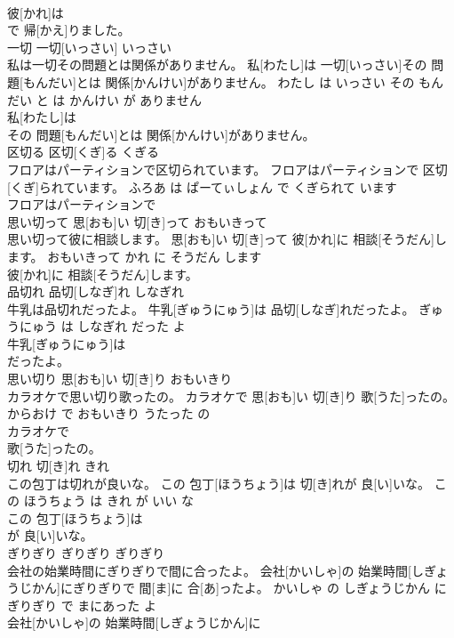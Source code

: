 \documentclass[8pt]{extreport}
\begin{document}
\begin{CJK}{UTF8}{min}
\\	彼[かれ]は
\\	で 帰[かえ]りました。			
\\	一切	一切[いっさい]	いっさい	
\\	私は一切その問題とは関係がありません。	私[わたし]は 一切[いっさい]その 問題[もんだい]とは 関係[かんけい]がありません。	わたし は いっさい その もんだい と は かんけい が ありません	
\\	私[わたし]は
\\	その 問題[もんだい]とは 関係[かんけい]がありません。			
\\	区切る	区切[くぎ]る	くぎる	
\\	フロアはパーティションで区切られています。	フロアはパーティションで 区切[くぎ]られています。	ふろあ は ぱーてぃしょん で くぎられて います	
\\	フロアはパーティションで
\\	思い切って	思[おも]い 切[き]って	おもいきって	
\\	思い切って彼に相談します。	思[おも]い 切[き]って 彼[かれ]に 相談[そうだん]します。	おもいきって かれ に そうだん します	
\\	彼[かれ]に 相談[そうだん]します。			
\\	品切れ	品切[しなぎ]れ	しなぎれ	
\\	牛乳は品切れだったよ。	牛乳[ぎゅうにゅう]は 品切[しなぎ]れだったよ。	ぎゅうにゅう は しなぎれ だった よ	
\\	牛乳[ぎゅうにゅう]は
\\	だったよ。			
\\	思い切り	思[おも]い 切[き]り	おもいきり	
\\	カラオケで思い切り歌ったの。	カラオケで 思[おも]い 切[き]り 歌[うた]ったの。	からおけ で おもいきり うたった の	
\\	カラオケで
\\	歌[うた]ったの。			
\\	切れ	切[き]れ	きれ	
\\	この包丁は切れが良いな。	この 包丁[ほうちょう]は 切[き]れが 良[い]いな。	この ほうちょう は きれ が いい な	
\\	この 包丁[ほうちょう]は
\\	が 良[い]いな。			
\\	ぎりぎり	ぎりぎり	ぎりぎり	
\\	会社の始業時間にぎりぎりで間に合ったよ。	会社[かいしゃ]の 始業時間[しぎょうじかん]にぎりぎりで 間[ま]に 合[あ]ったよ。	かいしゃ の しぎょうじかん に ぎりぎり で まにあった よ	
\\	会社[かいしゃ]の 始業時間[しぎょうじかん]に

\end{CJK}
\end{document}
